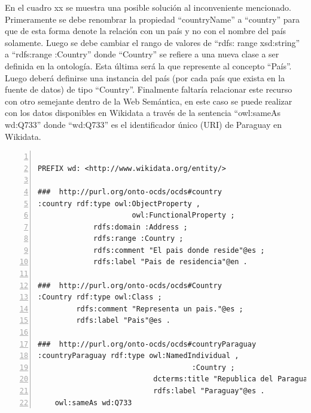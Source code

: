  En el cuadro xx se muestra una posible solución al inconveniente mencionado. Primeramente se debe renombrar la propiedad “countryName” a “country” para que de esta forma denote la relación con un país y no con el nombre del país solamente. Luego se debe cambiar el rango de valores de “rdfs: range xsd:string” a “rdfs:range :Country” donde “Country” se refiere a una nueva clase a ser definida en la ontología. Esta última será la que represente al concepto “País”. Luego deberá definirse una instancia del país (por cada país que exista en la fuente de datos) de tipo “Country”. Finalmente faltaría relacionar este recurso con otro semejante dentro de la Web Semántica, en este caso se puede realizar con los datos disponibles en Wikidata a través de la sentencia “owl:sameAs wd:Q733” donde “wd:Q733” es el identificador único (URI) de Paraguay en Wikidata.

 \begin{lstlisting}[captionpos=b, caption=Información referente al proceso licitatorio cuyo identificacor es, label=lst:caso1,  numbers=left,  numberstyle=\tiny\color{mygray},
    basicstyle=\small,frame=single]

PREFIX wd: <http://www.wikidata.org/entity/>

###  http://purl.org/onto-ocds/ocds#country
:country rdf:type owl:ObjectProperty ,
                      owl:FunctionalProperty ;
             rdfs:domain :Address ;
             rdfs:range :Country ;
             rdfs:comment "El pais donde reside"@es ;
             rdfs:label "Pais de residencia"@en .

###  http://purl.org/onto-ocds/ocds#Country
:Country rdf:type owl:Class ;
         rdfs:comment "Representa un pais."@es ;
         rdfs:label "Pais"@es .

###  http://purl.org/onto-ocds/ocds#countryParaguay
:countryParaguay rdf:type owl:NamedIndividual ,
                                    :Country ;
                           dcterms:title "Republica del Paraguay"@es ;
                           rdfs:label "Paraguay"@es .
    owl:sameAs wd:Q733
 \end{lstlisting}

